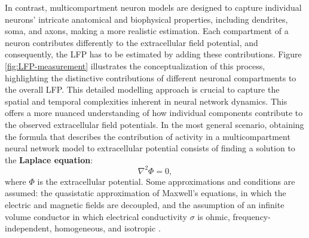 \documentclass[../main.tex]{subfiles}
\begin{document}
In contrast, multicompartment neuron models are designed to capture individual neurons' intricate anatomical and biophysical properties, including dendrites, soma, and axons, making a more realistic estimation.
Each compartment of a neuron contributes differently to the extracellular field potential, and consequently, the LFP has to be estimated by adding these contributions.
Figure \ref{fig:LFP-measurement} illustrates the conceptualization of this process, highlighting the distinctive contributions of different neuronal compartments to the overall LFP.
This detailed modelling approach is crucial to capture the spatial and temporal complexities inherent in neural network dynamics.
This offers a more nuanced understanding of how individual components contribute to the observed extracellular field potentials.
In the most general scenario, obtaining the formula that describes the contribution of activity in a multicompartment neural network model to extracellular potential consists of finding a solution to the \textbf{Laplace equation}:
\begin{equation}
    \nabla^2\Phi = 0
    \label{eq:laplace-equation},
\end{equation}
where $\Phi$ is the extracellular potential.
Some approximations and conditions are assumed: the quasistatic approximation of Maxwell's equations, in which the electric and magnetic fields are decoupled, and the assumption of an infinite volume conductor in which electrical conductivity $\sigma$ is ohmic, frequency-independent, homogeneous, and isotropic \citep{einevoll_modelling_2013}.
\end{document}
